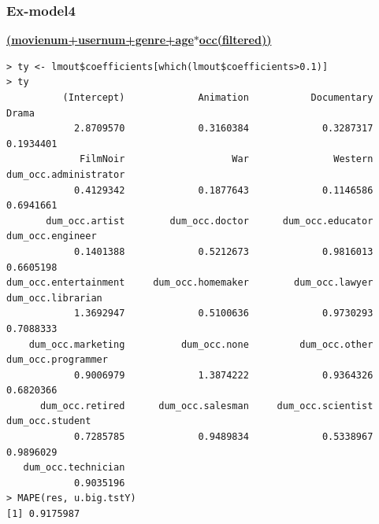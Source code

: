 \documentclass[11pt]{article}
\begin{document}
\subsubsection{Ex-model4}
\textbf{\underline{(movienum+usernum+genre+age$*$occ(filtered))}}
\begin{verbatim}
> ty <- lmout$coefficients[which(lmout$coefficients>0.1)]
> ty
          (Intercept)             Animation           Documentary                 Drama 
            2.8709570             0.3160384             0.3287317             0.1934401 
             FilmNoir                   War               Western dum_occ.administrator 
            0.4129342             0.1877643             0.1146586             0.6941661 
       dum_occ.artist        dum_occ.doctor      dum_occ.educator      dum_occ.engineer 
            0.1401388             0.5212673             0.9816013             0.6605198 
dum_occ.entertainment     dum_occ.homemaker        dum_occ.lawyer     dum_occ.librarian 
            1.3692947             0.5100636             0.9730293             0.7088333 
    dum_occ.marketing          dum_occ.none         dum_occ.other    dum_occ.programmer 
            0.9006979             1.3874222             0.9364326             0.6820366 
      dum_occ.retired      dum_occ.salesman     dum_occ.scientist       dum_occ.student 
            0.7285785             0.9489834             0.5338967             0.9896029 
   dum_occ.technician 
            0.9035196
> MAPE(res, u.big.tstY)
[1] 0.9175987
\end{verbatim}
\end{document}
